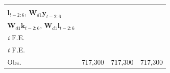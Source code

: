 \begin{tabular}{lccc}
{		} & \makecell[tc]{
			\footnotesize{$\mathbf{y}_{t-2:6}$, $\mathbf{k}_{t-2:6}$} 
			\\
			\footnotesize{$\mathbf{l}_{t-2:6}$, $\mathbf{W}_{d1}\mathbf{y}_{t-2:6}$} 
			\\
			\footnotesize{$\mathbf{W}_{d1}\mathbf{k}_{t-2:6}$, $\mathbf{W}_{d1}\mathbf{l}_{t-2:6}$} 
		}
		\\
		\textit{i} F.E. & \checkmark & \checkmark & \checkmark
		\\
		\textit{t} F.E. & \checkmark & \checkmark & \checkmark
		\\
		Obs. & 717,300 & 717,300 & 717,300
		\\
		\bottomrule
	\end{tabular}